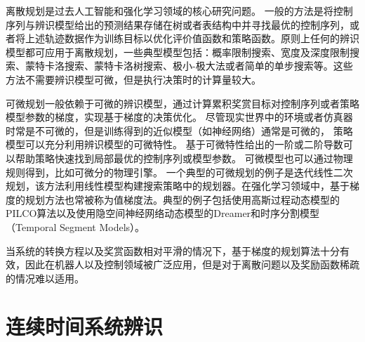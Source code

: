 离散规划是过去人工智能和强化学习领域的核心研究问题。
一般的方法是将控制序列与辨识模型给出的预测结果存储在树或者表结构中并寻找最优的控制序列，或者将上述轨迹数据作为训练目标以优化评价值函数和策略函数。原则上任何的辨识模型都可应用于离散规划，一些典型模型包括：概率限制搜索\cite{lai2015giraffe}、宽度及深度限制搜索\cite{franccois2019combined}、蒙特卡洛搜索\cite{silver2008sample}、蒙特卡洛树搜索\cite{silver2017mastering}、极小-极大法或者简单的单步搜索\cite{sutton1990integrated}等。这些方法不需要辨识模型可微，但是执行决策时的计算量较大。

可微规划一般依赖于可微的辨识模型，通过计算累积奖赏目标对控制序列或者策略模型参数的梯度，实现基于梯度的决策优化。
尽管现实世界中的环境或者仿真器时常是不可微的，但是训练得到的近似模型（如神经网络）通常是可微的，
策略模型可以充分利用辨识模型的可微特性。
基于可微特性给出的一阶或二阶导数可以帮助策略快速找到局部最优的控制序列或模型参数。
可微模型也可以通过物理规则得到，比如可微分的物理引擎\cite{degrave2019differentiable,de2018end}。
一个典型的可微规划的例子是迭代线性二次规划，该方法利用线性模型构建搜索策略中的规划器\cite{NIPS2014_6766aa27}。在强化学习领域中，基于梯度的规划方法也常被称为值梯度法。典型的例子包括使用高斯过程动态模型的PILCO算法\cite{deisenroth2011pilco}以及使用隐空间神经网络动态模型的Dreamer\cite{hafner2019dream}和时序分割模型（Temporal Segment Models）\cite{mishra2017prediction}。

当系统的转换方程以及奖赏函数相对平滑的情况下，基于梯度的规划算法十分有效，因此在机器人以及控制领域被广泛应用，但是对于离散问题以及奖励函数稀疏的情况难以适用。


\section{连续时间系统辨识}


